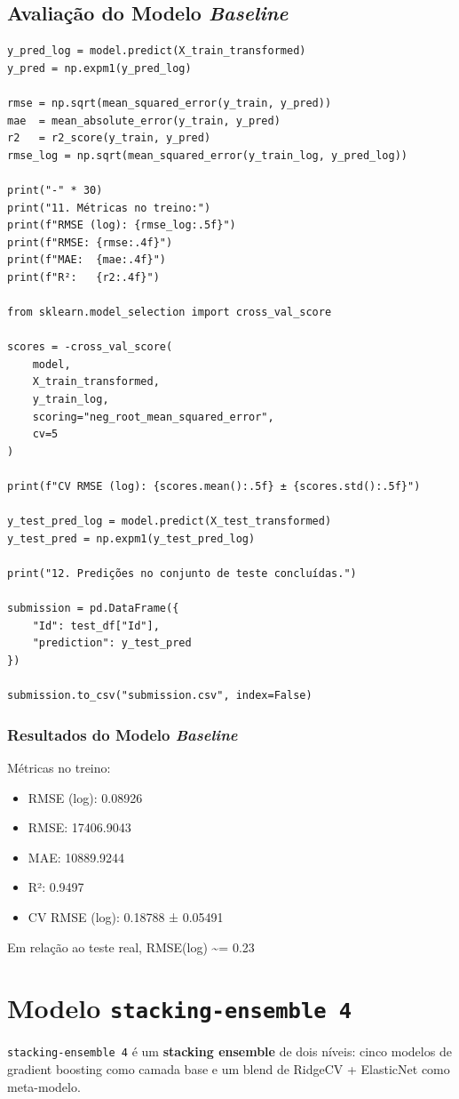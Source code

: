 \documentclass[11pt]{article}
\begin{document}
\subsection{Avaliação do Modelo \emph{Baseline}}
\label{sec:org46b34fe}

\begin{verbatim}
y_pred_log = model.predict(X_train_transformed)
y_pred = np.expm1(y_pred_log)

rmse = np.sqrt(mean_squared_error(y_train, y_pred))
mae  = mean_absolute_error(y_train, y_pred)
r2   = r2_score(y_train, y_pred)
rmse_log = np.sqrt(mean_squared_error(y_train_log, y_pred_log))

print("-" * 30)
print("11. Métricas no treino:")
print(f"RMSE (log): {rmse_log:.5f}")
print(f"RMSE: {rmse:.4f}")
print(f"MAE:  {mae:.4f}")
print(f"R²:   {r2:.4f}")

from sklearn.model_selection import cross_val_score

scores = -cross_val_score(
    model,
    X_train_transformed,
    y_train_log,
    scoring="neg_root_mean_squared_error",
    cv=5
)

print(f"CV RMSE (log): {scores.mean():.5f} ± {scores.std():.5f}")

y_test_pred_log = model.predict(X_test_transformed)
y_test_pred = np.expm1(y_test_pred_log)

print("12. Predições no conjunto de teste concluídas.")

submission = pd.DataFrame({
    "Id": test_df["Id"],
    "prediction": y_test_pred
})

submission.to_csv("submission.csv", index=False)
\end{verbatim}
\subsubsection{Resultados do Modelo \emph{Baseline}}
\label{sec:orgbff5ae6}
Métricas no treino:
\begin{itemize}
\item RMSE (log): 0.08926
\item RMSE: 17406.9043
\item MAE:  10889.9244
\item R²:   0.9497
\item CV RMSE (log): 0.18788 ± 0.05491
\end{itemize}

Em relação ao teste real, RMSE(log) \textasciitilde{}= 0.23
\section{Modelo \texttt{stacking-ensemble 4}}
\label{sec:org8c692e8}
\texttt{stacking-ensemble 4} é um \textbf{stacking ensemble} de dois níveis: cinco modelos de gradient boosting como camada base e um blend de RidgeCV + ElasticNet como meta-modelo.
\end{document}
